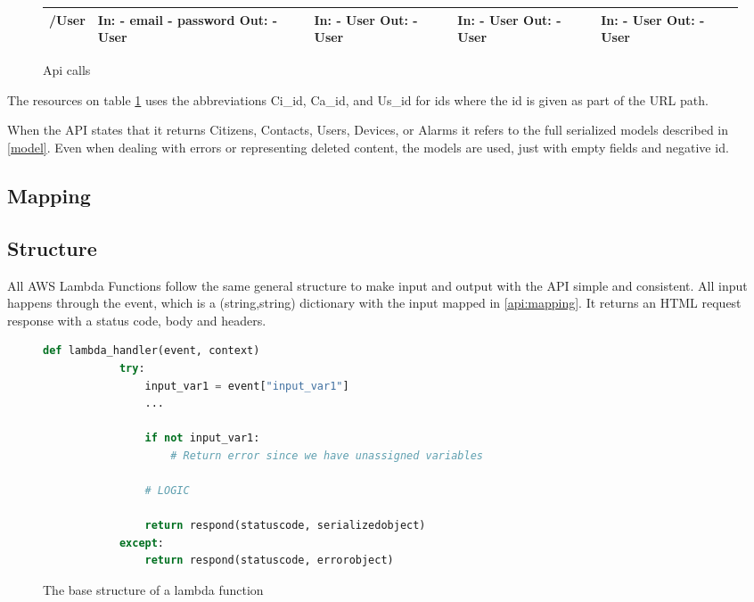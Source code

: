 \begin{figure}[H]
\begin{tabular}{|l|p{2cm}|p{2cm}|p{2cm}|p{2cm}|}
         /User & In: \newline - email \newline - password \newline Out: \newline - User & In: \newline - User \newline Out: \newline - User & In: \newline - User \newline Out: \newline - User & In: \newline - User \newline Out: \newline - User \\ \hline
    \end{tabular}
    \caption{Api calls}
    \label{table:api}
\end{figure}

The resources on table \ref{table:api} uses the abbreviations Ci\_id, Ca\_id, and Us\_id for ids where the id is given as part of the URL path.

When the API states that it returns Citizens, Contacts, Users, Devices, or Alarms it refers to the full serialized models described in \ref{model}. Even when dealing with errors or representing deleted content, the models are used, just with empty fields and negative id.

\subsection*{Mapping} \label{api:mapping}


\subsection*{Structure}
All AWS Lambda Functions follow the same general structure to make input and output with the API simple and consistent.
All input happens through the event, which is a (string,string) dictionary with the input mapped in \ref{api:mapping}.
It returns an HTML request response with a status code, body and headers.

\begin{figure}[H]
    \centering
    \begin{lstlisting}[language=Python]
        def lambda_handler(event, context)
            try:
                input_var1 = event["input_var1"]
                ...
                
                if not input_var1:
                    # Return error since we have unassigned variables
                    
                # LOGIC
                
                return respond(statuscode, serializedobject)
            except:
                return respond(statuscode, errorobject)
    \end{lstlisting}
    \caption{The base structure of a lambda function}
    \label{fig:samplelambdafunction}
\end{figure}

